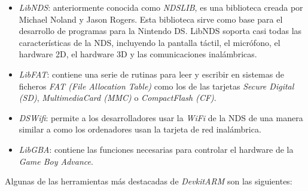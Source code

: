 \begin{itemize}
\item \textit{LibNDS}: anteriormente conocida como \textit{NDSLIB}, es una biblioteca creada por Michael Noland y Jason Rogers. Esta biblioteca sirve como base para el desarrollo de programas para la Nintendo DS. LibNDS soporta casi todas las características de la NDS, incluyendo la pantalla táctil, el micrófono, el hardware 2D,
el hardware 3D y las comunicaciones inalámbricas.
%
\item \textit{LibFAT}: contiene una serie de rutinas para leer y escribir en sistemas de ficheros \textit{FAT (File Allocation Table)} como los de las tarjetas \textit{Secure Digital (SD)}, \textit{MultimediaCard (MMC)} o \textit{CompactFlash (CF)}.
%
\item \textit{DSWifi}: permite a los desarrolladores usar la \textit{WiFi} de la NDS de una manera similar a como los ordenadores usan la tarjeta de red inalámbrica.
%
\item \textit{LibGBA}: contiene las funciones necesarias para controlar el hardware de la \textit{Game Boy Advance}.
\end{itemize}

Algunas de las herramientas más destacadas de \textit{DevkitARM} son las siguientes:

